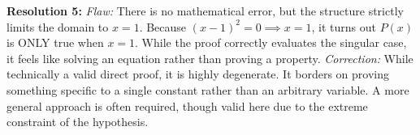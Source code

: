 \documentclass[11pt]{article}
\theoremstyle{remark}
\begin{document}
\textbf{Resolution 5:}
\textit{Flaw:} There is no mathematical error, but the structure strictly limits the domain to $x=1$. Because $(x-1)^2 = 0 \implies x=1$, it turns out $P(x)$ is ONLY true when $x=1$. While the proof correctly evaluates the singular case, it feels like solving an equation rather than proving a property.
\textit{Correction:} While technically a valid direct proof, it is highly degenerate. It borders on proving something specific to a single constant rather than an arbitrary variable. A more general approach is often required, though valid here due to the extreme constraint of the hypothesis.
\end{document}
